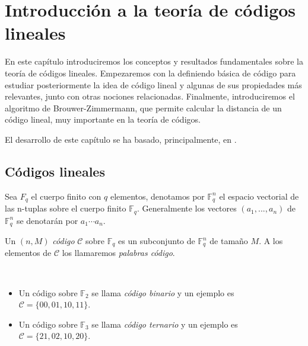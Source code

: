 \newpage
\null
\thispagestyle{empty}

\chapter{Introducción a la teoría de códigos lineales}
\label{cap:2}

En este capítulo introduciremos los conceptos y resultados fundamentales sobre la teoría de códigos lineales. Empezaremos con la definiendo básica de código para estudiar posteriormente la idea de código lineal y algunas de sus propiedades más relevantes, junto con otras nociones relacionadas. Finalmente, introduciremos el algoritmo de Brouwer-Zimmermann, que permite calcular la distancia de un código lineal, muy importante en la teoría de códigos. 

El desarrollo de este capítulo se ha basado, principalmente, en \cite[Capítulo 1]{Huffman_Pless_2010}.

\section{Códigos lineales}

Sea $F_q$ el cuerpo finito con $q$ elementos, denotamos por $\mathbb{F}_q^n$ el espacio vectorial de las n-tuplas sobre el cuerpo finito $\mathbb{F}_q$. Generalmente los vectores $(a_1, ..., a_n)$ de $\mathbb{F}_q^n$ se denotarán por $a_1 \cdots a_n$.

\begin{definition}
    Un $(n, M)$ \emph{código} $\mathcal{C}$ sobre $\mathbb{F}_q$ es un subconjunto de 
    $\mathbb{F}_q^n$ de tamaño $M$. A los elementos de $\mathcal{C}$ los llamaremos \emph{palabras código}.
\end{definition}

\begin{exampleth}
    $ $
    \begin{itemize}
        \item Un código sobre $\mathbb{F}_2$ se llama \emph{código binario} y un ejemplo es $\mathcal{C} = \{00, 01, 10, 11\}$.
        \item Un código sobre $\mathbb{F}_3$ se llama \emph{código ternario} y un ejemplo es $\mathcal{C} = \{21, 02, 10, 20\}$.
    \end{itemize}
\end{exampleth}


